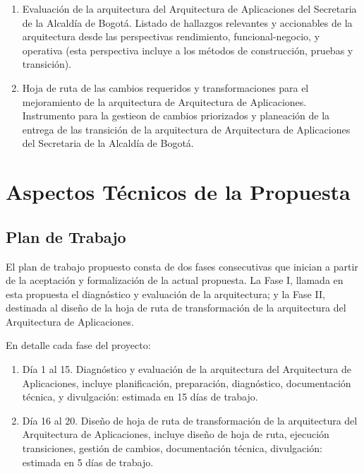 \documentclass[
	a4paper, %
	12pt, %
]{include/CSSullivanBusinessReport}
\def\tightlist{}
\begin{document}
\begin{quote}
\end{quote}

\begin{enumerate}
\def\labelenumi{\arabic{enumi}.}
\tightlist
\item
  Evaluación de la arquitectura del Arquitectura de Aplicaciones del
  Secretaria de la Alcaldía de Bogotá. Listado de hallazgos relevantes y
  accionables de la arquitectura desde las perspectivas rendimiento,
  funcional-negocio, y operativa (esta perspectiva incluye a los métodos
  de construcción, pruebas y transición).
\item
  Hoja de ruta de las cambios requeridos y transformaciones para el
  mejoramiento de la arquitectura de Arquitectura de Aplicaciones.
  Instrumento para la gestieon de cambios priorizados y planeación de la
  entrega de las transición de la arquitectura de Arquitectura de
  Aplicaciones del Secretaria de la Alcaldía de Bogotá.
\end{enumerate}

\newpage

\section{Aspectos Técnicos de la
Propuesta}\label{sec:aspectos-tuxe9cnicos-de-la-propuesta}

\subsection{Plan de Trabajo}\label{sec:plan-de-trabajo}

\begin{quote}
\end{quote}

El plan de trabajo propuesto consta de dos fases consecutivas que
inician a partir de la aceptación y formalización de la actual
propuesta. La Fase I, llamada en esta propuesta el diagnóstico y
evaluación de la arquitectura; y la Fase II, destinada al diseño de la
hoja de ruta de transformación de la arquitectura del Arquitectura de
Aplicaciones.

En detalle cada fase del proyecto:

\begin{enumerate}
\def\labelenumi{\arabic{enumi}.}
\item
  Día 1 al 15. Diagnóstico y evaluación de la arquitectura del
  Arquitectura de Aplicaciones, incluye planificación, preparación,
  diagnóstico, documentación técnica, y divulgación: estimada en 15 días
  de trabajo.
\item
  Día 16 al 20. Diseño de hoja de ruta de transformación de la
  arquitectura del Arquitectura de Aplicaciones, incluye diseño de hoja
  de ruta, ejecución transiciones, gestión de cambios, documentación
  técnica, divulgación: estimada en 5 días de trabajo.
\end{enumerate}
\end{document}
